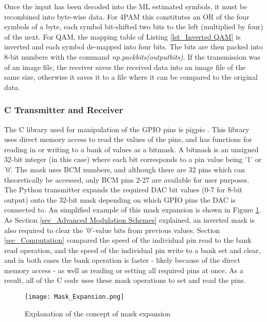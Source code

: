 \documentclass[../main.tex]{subfiles}
\begin{document}
Once the input has been decoded into the ML estimated symbols, it must be recombined into byte-wise data.
For 4PAM this constitutes an OR of the four symbols of a byte, each symbol bit-shifted two bits to the left (multiplied by four) of the next.
For QAM, the mapping table of Listing \ref{lst_Inverted QAM} is inverted and each symbol de-mapped into four bits.
The bits are then packed into 8-bit numbers with the command \textit{np.packbits(output\textunderscore bits)}.
If the transmission was of an image file, the receiver saves the received data into an image file of the same size, otherwise it saves it to a file where it can be compared to the original data.



\subsubsection{C Transmitter and Receiver} \label{sec_C Transmitter and Receiver}

The C library used for manipulation of the GPIO pins is pigpio \cite{lib_pigpio}.
This library uses direct memory access to read the values of the pins, and has functions for reading in or writing to a bank of values as a bitmask.
A bitmask is an unsigned 32-bit integer (in this case) where each bit corresponds to a pin value being '1' or '0'.
The mask uses BCM numbers, and although there are 32 pins which can theoretically be accessed, only BCM pins 2-27 are available for user purposes.
The Python transmitter expands the required DAC bit values (0-7 for 8-bit output) onto the 32-bit mask depending on which GPIO pins the DAC is connected to.
An simplified example of this mask expansion is shown in Figure \ref{fig_Mask Expansion}.
As Section \ref{sec_Advanced Modulation Schemes} explained, an inverted mask is also required to clear the '0'-value bits from previous values.
Section \ref{sec_Computation} compared the speed of the individual pin read to the bank read operation, and the speed of the individual pin write to a bank set and clear, and in both cases the bank operation is faster - likely because of the direct memory access - as well as reading or setting all required pins at once.
As a result, all of the C code uses these mask operations to set and read the pins.\\

\begin{figure}[ht]
	\centering
	\texttt{[image: Mask\_Expansion.png]}
	\caption{Explanation of the concept of mask expansion}
	\label{fig_Mask Expansion}
\end{figure}
\end{document}
